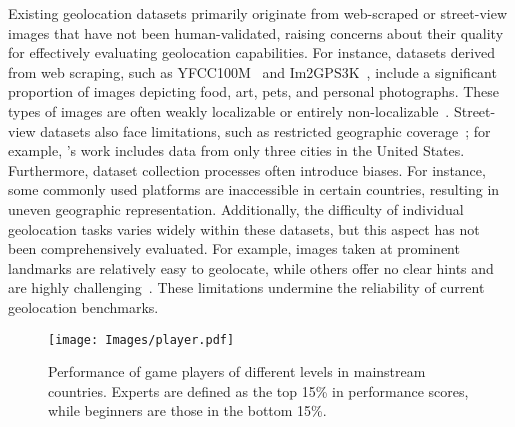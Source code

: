 Existing geolocation datasets primarily originate from web-scraped or street-view images that have not been human-validated, raising concerns about their quality for effectively evaluating geolocation capabilities. 
For instance, datasets derived from web scraping, such as YFCC100M~\cite{theiner2022} and Im2GPS3K~\cite{vo2017revisiting}, include a significant proportion of images depicting food, art, pets, and personal photographs. 
These types of images are often weakly localizable or entirely non-localizable~\cite{YFCC-Val26k-Interpretable}.
Street-view datasets also face limitations, such as restricted geographic coverage~\cite{astruc2024openstreetview}; for example, \cite{mirowski2019streetlearn-navigation}'s work includes data from only three cities in the United States.
Furthermore, dataset collection processes often introduce biases. 
For instance, some commonly used platforms are inaccessible in certain countries, resulting in uneven geographic representation. 
Additionally, the difficulty of individual geolocation tasks varies widely within these datasets, but this aspect has not been comprehensively evaluated. 
For example, images taken at prominent landmarks are relatively easy to geolocate, while others offer no clear hints and are highly challenging~\cite{astruc2024openstreetview}.
These limitations undermine the reliability of current geolocation benchmarks.





\begin{figure*}[htb]
    \centering
    \texttt{[image: Images/player.pdf]}
    \caption{Performance of game players of different levels in mainstream countries.
    Experts are defined as the top 15\% in performance scores, while beginners are those in the bottom 15\%.
    }
    \label{fig:player_score}
\end{figure*}

